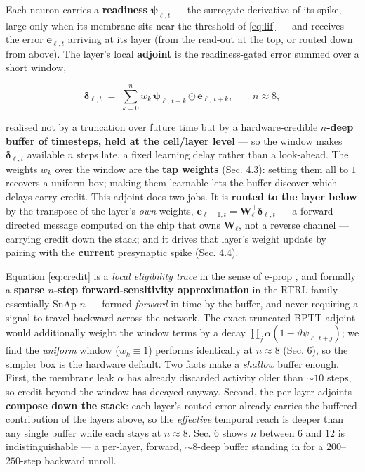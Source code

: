 \documentclass[11pt]{article}
\begin{document}
Each neuron carries a \textbf{readiness} \(\bm\psi_{\ell,t}\) --- the
surrogate derivative of its spike, large only when its membrane sits
near the threshold of \eqref{eq:lif} --- and receives the error
\(\bm e_{\ell,t}\) arriving at its layer (from the read-out at the top,
or routed down from above). The layer's local \textbf{adjoint} is the
readiness-gated error summed over a short window,

\begin{equation}
\bm\delta_{\ell,t} \;=\; \sum_{k=0}^{n} w_k\,\bm\psi_{\ell,\,t+k} \odot \bm e_{\ell,\,t+k}, \qquad n \approx 8,
\label{eq:credit}
\end{equation}

realised not by a truncation over future time but by a hardware-credible
\textbf{\(n\)-deep buffer of timesteps, held at the cell/layer level}
--- so the window makes \(\bm\delta_{\ell,t}\) available \(n\) steps
late, a fixed learning delay rather than a look-ahead. The weights
\(w_k\) over the window are the \textbf{tap weights} (Sec. 4.3): setting
them all to \(1\) recovers a uniform box; making them learnable lets the
buffer discover which delays carry credit. This adjoint does two jobs.
It is \textbf{routed to the layer below} by the transpose of the layer's
\emph{own} weights,
\(\bm e_{\ell-1,t} = \bm W_\ell^{\!\top}\bm\delta_{\ell,t}\) --- a
forward-directed message computed on the chip that owns \(\bm W_\ell\),
not a reverse channel --- carrying credit down the stack; and it drives
that layer's weight update by pairing with the \textbf{current}
presynaptic spike (Sec. 4.4).

Equation \eqref{eq:credit} is a \emph{local eligibility trace} in the
sense of e-prop \cite{bellec2020eprop}, and formally a \textbf{sparse
\(n\)-step forward-sensitivity approximation} in the RTRL family ---
essentially SnAp-\(n\) \cite{menick2021snap} --- formed \emph{forward}
in time by the buffer, and never requiring a signal to travel backward
across the network. The exact truncated-BPTT adjoint would additionally
weight the window terms by a decay
\(\prod_{j}\alpha(1-\vartheta\psi_{\ell,t+j})\); we find the
\emph{uniform} window (\(w_k\equiv1\)) performs identically at
\(n\approx8\) (Sec. 6), so the simpler box is the hardware default. Two
facts make a \emph{shallow} buffer enough. First, the membrane leak
\(\alpha\) has already discarded activity older than \({\sim}10\) steps,
so credit beyond the window has decayed anyway. Second, the per-layer
adjoints \textbf{compose down the stack}: each layer's routed error
already carries the buffered contribution of the layers above, so the
\emph{effective} temporal reach is deeper than any single buffer while
each stays at \(n\approx8\). Sec. 6 shows \(n\) between \(6\) and \(12\)
is indistinguishable --- a per-layer, forward, \({\sim}8\)-deep buffer
standing in for a \(200\)--\(250\)-step backward unroll.
\end{document}
